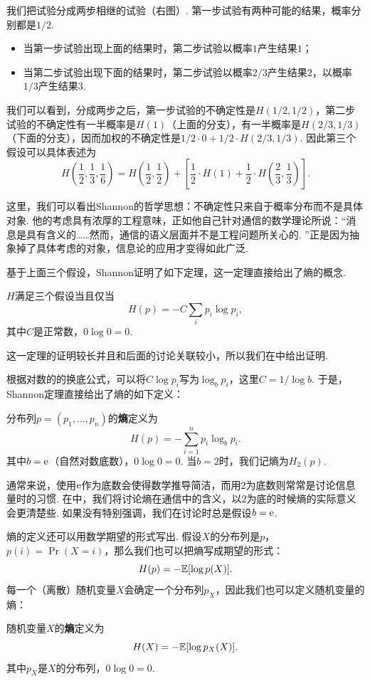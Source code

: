 我们把试验分成两步相继的试验（右图）. 第一步试验有两种可能的结果，概率分别都是$1/2$.
\begin{itemize}
    \item  当第一步试验出现上面的结果时，第二步试验以概率$1$产生结果$1$；
    \item  当第二步试验出现下面的结果时，第二步试验以概率$2/3$产生结果$2$，以概率$1/3$产生结果$3$.
\end{itemize}
我们可以看到，分成两步之后，第一步试验的不确定性是$H(1/2,1/2)$，第二步试验的不确定性有一半概率是$H(1)$（上面的分支），有一半概率是$H(2/3,1/3)$（下面的分支），因而加权的不确定性是$1/2\cdot 0+1/2\cdot H(2/3,1/3)$. 因此第三个假设可以具体表述为
\[
H\left(\frac{1}{2},\frac{1}{3},\frac{1}{6}\right)=H\left(\frac{1}{2},\frac{1}{2}\right)+\left[\frac{1}{2}\cdot H(1)+\frac{1}{2}\cdot H\left(\frac{2}{3},\frac{1}{3}\right)\right].
\]

这里，我们可以看出Shannon的哲学思想：不确定性只来自于概率分布而不是具体对象. 他的考虑具有浓厚的工程意味，正如他自己针对通信的数学理论所说：“消息是具有含义的……然而，通信的语义层面并不是工程问题所关心的. ”正是因为抽象掉了具体考虑的对象，信息论的应用才变得如此广泛. 

基于上面三个假设，Shannon证明了如下定理，这一定理直接给出了熵的概念.

\begin{theorem}[Shannon定理]\label{thm:Shannon-thm}
    $H$满足三个假设当且仅当
    \[H(p)=-C\sum_{i}p_i\log p_i,\]
    其中$C$是正常数，$0\log 0=0$.
\end{theorem}
这一定理的证明较长并且和后面的讨论关联较小，所以我们在中给出证明.

根据对数的的换底公式，可以将$C\log p_i$写为$\log_bp_i$，这里$C=1/\log b$. 于是，Shannon定理直接给出了熵的如下定义：
\begin{definition}[熵]
    分布列$p=(p_1,\dots,p_n)$的\textbf{熵}定义为
    \[H(p)=-\sum_{i=1}^np_i\log_b p_i.\]
    其中$b=\mathrm{e}$（自然对数底数），$0\log 0=0$. 当$b=2$时，我们记熵为$H_2(p)$.
\end{definition}

通常来说，使用$\mathrm{e}$作为底数会使得数学推导简洁，而用$2$为底数则常常是讨论信息量时的习惯. 在中，我们将讨论熵在通信中的含义，以$2$为底的时候熵的实际意义会更清楚些. 如果没有特别强调，我们在讨论时总是假设$b=\mathrm{e}$.

熵的定义还可以用数学期望的形式写出. 假设$X$的分布列是$p$，$p(i)=\Pr(X=i)$，那么我们也可以把熵写成期望的形式：
\[H(p)=-\mathbb{E}[\log p(X)].\]
每一个（离散）随机变量$X$会确定一个分布列$p_X$，因此我们也可以定义随机变量的熵：
\begin{definition}[随机变量的熵]
    随机变量$X$的\textbf{熵}定义为
    \[H(X)=-\mathbb{E}[\log p_X(X)].\]
    其中$p_X$是$X$的分布列，$0\log 0=0$.
\end{definition}

